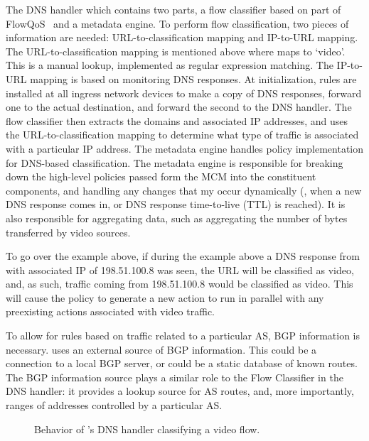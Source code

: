 The DNS handler which contains two parts, a flow classifier based on part of FlowQoS~\cite{FlowQoS} and a metadata engine. To perform flow classification, two pieces of information are needed: URL-to-classification mapping and IP-to-URL mapping. The URL-to-classification mapping is mentioned above where  maps to `video'. This is a manual lookup, implemented as regular expression matching. The IP-to-URL mapping is based on monitoring DNS responses. At initialization, rules are installed at all ingress network devices to make a copy of DNS responses, forward one to the actual destination, and forward the second to the DNS handler. The flow classifier then extracts the domains and associated IP addresses, and uses the URL-to-classification mapping to determine what type of traffic is associated with a particular IP address. 
The metadata engine handles policy implementation for DNS-based classification. The metadata engine is responsible for breaking down the high-level policies passed form the MCM into the constituent components, and handling any changes that my occur dynamically (\ie{}, when a new DNS response comes in, or DNS response time-to-live (TTL) is reached). It is also responsible for aggregating data, such as aggregating the number of bytes transferred by video sources.

To go over the example above, if during the example above a DNS response from  with associated IP of 198.51.100.8 was seen, the URL will be classified as video, and, as such, traffic coming from 198.51.100.8 would be classified as video. This will cause the  policy to generate a new  action to run in parallel with any preexisting actions associated with video traffic. 

To allow for rules based on traffic related to a particular AS, BGP information is necessary. \system{} uses an external source of BGP information. This could be a connection to a local BGP server, or could be a static database of known routes. The BGP information source plays a similar role to the Flow Classifier in the DNS handler: it provides a lookup source for AS routes, and, more importantly, ranges of addresses controlled by a particular AS.



\begin{figure}
    \centering
    \caption{Behavior of \system{}'s DNS handler classifying a video flow.}
    \label{fig:flow}
\end{figure}


